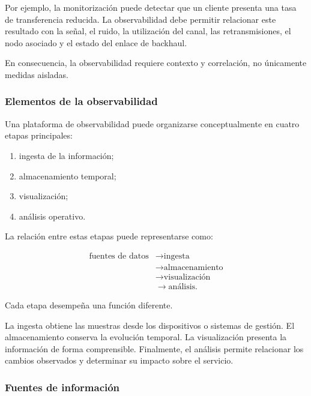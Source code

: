 Por ejemplo, la monitorización puede detectar que un cliente presenta
una tasa de transferencia reducida. La observabilidad debe permitir
relacionar este resultado con la señal, el ruido, la utilización del
canal, las retransmisiones, el nodo asociado y el estado del enlace de
backhaul.

En consecuencia, la observabilidad requiere contexto y correlación, no
únicamente medidas aisladas.


\subsubsection*{Elementos de la observabilidad}

Una plataforma de observabilidad puede organizarse conceptualmente en
cuatro etapas principales:

\begin{enumerate}
    \item ingesta de la información;

    \item almacenamiento temporal;

    \item visualización;

    \item análisis operativo.
\end{enumerate}

La relación entre estas etapas puede representarse como:

\[
\begin{aligned}
    \text{fuentes de datos}
    &\longrightarrow
    \text{ingesta}\\
    &\longrightarrow
    \text{almacenamiento}\\
    &\longrightarrow
    \text{visualización}\\
    &\longrightarrow
    \text{análisis}.
\end{aligned}
\]

Cada etapa desempeña una función diferente.

La ingesta obtiene las muestras desde los dispositivos o sistemas de
gestión. El almacenamiento conserva la evolución temporal. La
visualización presenta la información de forma comprensible. Finalmente,
el análisis permite relacionar los cambios observados y determinar su
impacto sobre el servicio.


\subsubsection*{Fuentes de información}


